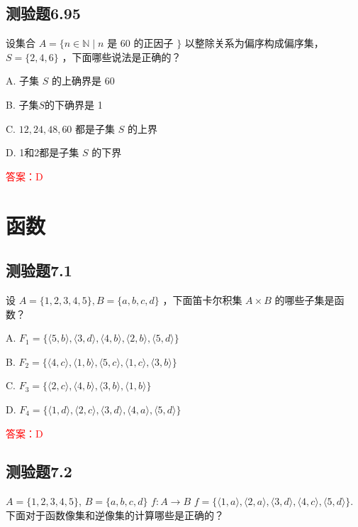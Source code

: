 \documentclass[UTF8, heading=true]{ctexart}
\begin{document}
\subsection{测验题6.95}

设集合 $A=\{n \in \mathbb{N} \mid n$ 是 60 的正因子 $\}$ 以整除关系为偏序构成偏序集，$S=\{2,4,6\}$ ，下面哪些说法是正确的？

A. 子集 $S$ 的上确界是 60

B. 子集$S$的下确界是 1

C. $12,24,48,60$ 都是子集 $S$ 的上界

D. 1和2都是子集 $S$ 的下界

\textcolor{red}{答案：D}




\clearpage

\section{函数}

\subsection{测验题7.1}

设 $A=\{1,2,3,4,5\}, B=\{a, b, c, d\}$ ，下面笛卡尔积集 $A \times B$ 的哪些子集是函数？

A. $F_1=\{\langle 5, b\rangle,\langle 3, d\rangle,\langle 4, b\rangle,\langle 2, b\rangle,\langle 5, d\rangle\}$

B. $F_2=\{\langle 4, c\rangle,\langle 1, b\rangle,\langle 5, c\rangle,\langle 1, c\rangle,\langle 3, b\rangle\}$

C. $F_3=\{\langle 2, c\rangle,\langle 4, b\rangle,\langle 3, b\rangle,\langle 1, b\rangle\}$

D. $F_4=\{\langle 1, d\rangle,\langle 2, c\rangle,\langle 3, d\rangle,\langle 4, a\rangle,\langle 5, d\rangle\}$



\textcolor{red}{答案：D}

\subsection{测验题7.2}


 $A=\{1,2,3,4,5\}$, $B=\{a, b, c, d\}$  $f: A \rightarrow B$  $f=\{\langle 1, a\rangle,\langle 2, a\rangle,\langle 3, d\rangle,\langle 4, c\rangle,\langle 5, d\rangle\}$.
下面对于函数像集和逆像集的计算哪些是正确的？
\end{document}

